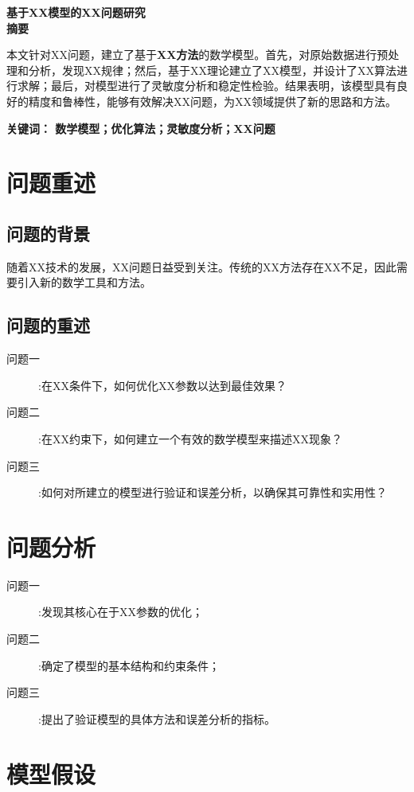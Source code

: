 \documentclass[12pt]{article}
\begin{document}
\begin{center}
{\textbf{基于XX模型的XX问题研究}} \\[2ex]
{\textbf{摘\quad 要}} \\
\end{center}

本文针对XX问题，建立了基于\textbf{XX方法}的数学模型。首先，对原始数据进行预处理和分析，发现XX规律；然后，基于XX理论建立了XX模型，并设计了XX算法进行求解；最后，对模型进行了灵敏度分析和稳定性检验。结果表明，该模型具有良好的精度和鲁棒性，能够有效解决XX问题，为XX领域提供了新的思路和方法。

\vspace{2ex}%
\noindent \textbf{关键词： 数学模型；优化算法；灵敏度分析；XX问题}

\newpage
\section{问题重述}
\subsection{问题的背景}

随着XX技术的发展，XX问题日益受到关注。传统的XX方法存在XX不足，因此需要引入新的数学工具和方法。
\subsection{问题的重述}
\begin{description}
    \item[问题一]:在XX条件下，如何优化XX参数以达到最佳效果？
    \item[问题二]:在XX约束下，如何建立一个有效的数学模型来描述XX现象？
    \item[问题三]:如何对所建立的模型进行验证和误差分析，以确保其可靠性和实用性？
\end{description}
\section{问题分析}
\begin{description}
    \item[问题一]:发现其核心在于XX参数的优化；
    \item[问题二]:确定了模型的基本结构和约束条件；
    \item[问题三]:提出了验证模型的具体方法和误差分析的指标。
\end{description}
\section{模型假设}
\end{document}
